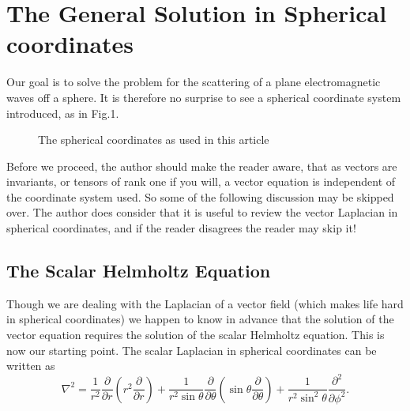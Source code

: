 \documentclass[12pt]{article}
\begin{document}
\section{The General Solution in Spherical coordinates}

Our goal is to solve the problem for the scattering of a plane electromagnetic
waves off a sphere. It is therefore  no surprise to see a 
spherical coordinate system introduced, as in Fig.1.
\vspace*{10cm}
\begin{figure}[htb]
\caption{The spherical coordinates as used in this article}
\end{figure}

Before we proceed, the author should make the reader aware, that as vectors are invariants, or tensors of rank one if you will, a vector equation is independent of the coordinate system used. So some of the following discussion may be skipped over. The author does consider that it is useful to review the vector Laplacian in spherical coordinates, and if the reader disagrees the reader may skip it!

\subsection{The Scalar Helmholtz Equation}

Though we are dealing with the Laplacian of a vector field (which makes life hard
 in spherical coordinates) we happen to know in advance that the solution of the
vector equation  requires the solution of the scalar Helmholtz equation. This is
now our starting point. The scalar Laplacian in spherical coordinates can be written as
\begin{equation}
\nabla^2=\frac{1}{r^2} \frac{\partial }{\partial r} \left ( r^2 \frac{\partial}{\partial r} \right )
+\frac{1}{ r^2 \sin \theta} \frac{\partial }{\partial \theta} \left ( \sin \theta \frac{\partial}{\partial \theta } \right )
+\frac{1}{r^2 \sin^2 \theta} \frac{\partial^2}{\partial \phi^2}.
\end{equation}
\end{document}

